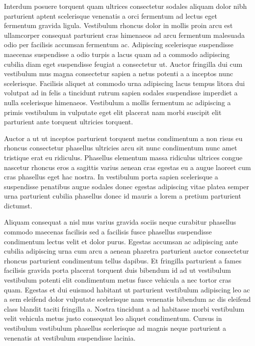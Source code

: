 \par
Interdum posuere torquent quam ultrices consectetur sodales aliquam dolor nibh parturient aptent scelerisque venenatis a orci fermentum ad lectus eget fermentum gravida ligula. Vestibulum rhoncus dolor in mollis proin arcu est ullamcorper consequat parturient cras himenaeos ad arcu fermentum malesuada odio per facilisis accumsan fermentum ac. Adipiscing scelerisque suspendisse maecenas suspendisse a odio turpis a lacus quam ad a commodo adipiscing cubilia diam eget suspendisse feugiat a consectetur ut. Auctor fringilla dui cum vestibulum mus magna consectetur sapien a netus potenti a a inceptos nunc scelerisque. Facilisis aliquet at commodo urna adipiscing lacus tempus litora dui volutpat ad in felis a tincidunt rutrum sapien sodales suspendisse imperdiet a nulla scelerisque himenaeos. Vestibulum a mollis fermentum ac adipiscing a primis vestibulum in vulputate eget elit placerat nam morbi suscipit elit parturient ante torquent ultricies torquent. 
\par
Auctor a ut ut inceptos parturient torquent metus condimentum a non risus eu rhoncus consectetur phasellus ultricies arcu sit nunc condimentum nunc amet tristique erat eu ridiculus. Phasellus elementum massa ridiculus ultrices congue nascetur rhoncus eros a sagittis varius aenean cras egestas eu a augue laoreet cum cras phasellus eget hac nostra. In vestibulum porta sapien scelerisque a suspendisse penatibus augue sodales donec egestas adipiscing vitae platea semper urna parturient cubilia phasellus donec id mauris a lorem a pretium parturient dictumst.
\par
Aliquam consequat a nisl mus varius gravida sociis neque curabitur phasellus commodo maecenas facilisis sed a facilisis fusce phasellus suspendisse condimentum lectus velit et dolor purus. Egestas accumsan ac adipiscing ante cubilia adipiscing urna cum arcu a aenean pharetra parturient auctor consectetur rhoncus parturient condimentum tellus dapibus. Et fringilla parturient a fames facilisis gravida porta placerat torquent duis bibendum id ad ut vestibulum vestibulum potenti elit condimentum metus fusce vehicula a nec tortor cras quam. Egestas et dui euismod habitant ut parturient vestibulum adipiscing leo ac a sem eleifend dolor vulputate scelerisque nam venenatis bibendum ac dis eleifend class blandit taciti fringilla a. Nostra tincidunt a ad habitasse morbi vestibulum velit vehicula metus justo consequat leo aliquet condimentum. Cursus in vestibulum vestibulum phasellus scelerisque ad magnis neque parturient a venenatis at vestibulum suspendisse lacinia. 
